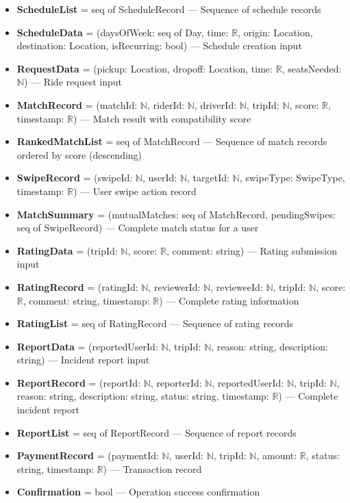 \begin{itemize}
    \item \textbf{ScheduleList} = seq of ScheduleRecord --- Sequence of schedule records
    \item \textbf{ScheduleData} = (daysOfWeek: seq of Day, time: $\mathbb{R}$, origin: Location, destination: Location, isRecurring: bool) --- Schedule creation input
    \item \textbf{RequestData} = (pickup: Location, dropoff: Location, time: $\mathbb{R}$, seatsNeeded: $\mathbb{N}$) --- Ride request input
    \item \textbf{MatchRecord} = (matchId: $\mathbb{N}$, riderId: $\mathbb{N}$, driverId: $\mathbb{N}$, tripId: $\mathbb{N}$, score: $\mathbb{R}$, timestamp: $\mathbb{R}$) --- Match result with compatibility score
    \item \textbf{RankedMatchList} = seq of MatchRecord --- Sequence of match records ordered by score (descending)
    \item \textbf{SwipeRecord} = (swipeId: $\mathbb{N}$, userId: $\mathbb{N}$, targetId: $\mathbb{N}$, swipeType: SwipeType, timestamp: $\mathbb{R}$) --- User swipe action record
    \item \textbf{MatchSummary} = (mutualMatches: seq of MatchRecord, pendingSwipes: seq of SwipeRecord) --- Complete match status for a user
    \item \textbf{RatingData} = (tripId: $\mathbb{N}$, score: $\mathbb{R}$, comment: string) --- Rating submission input
    \item \textbf{RatingRecord} = (ratingId: $\mathbb{N}$, reviewerId: $\mathbb{N}$, revieweeId: $\mathbb{N}$, tripId: $\mathbb{N}$, score: $\mathbb{R}$, comment: string, timestamp: $\mathbb{R}$) --- Complete rating information
    \item \textbf{RatingList} = seq of RatingRecord --- Sequence of rating records
    \item \textbf{ReportData} = (reportedUserId: $\mathbb{N}$, tripId: $\mathbb{N}$, reason: string, description: string) --- Incident report input
    \item \textbf{ReportRecord} = (reportId: $\mathbb{N}$, reporterId: $\mathbb{N}$, reportedUserId: $\mathbb{N}$, tripId: $\mathbb{N}$, reason: string, description: string, status: string, timestamp: $\mathbb{R}$) --- Complete incident report
    \item \textbf{ReportList} = seq of ReportRecord --- Sequence of report records
    \item \textbf{PaymentRecord} = (paymentId: $\mathbb{N}$, userId: $\mathbb{N}$, tripId: $\mathbb{N}$, amount: $\mathbb{R}$, status: string, timestamp: $\mathbb{R}$) --- Transaction record
    \item \textbf{Confirmation} = bool --- Operation success confirmation
\end{itemize}